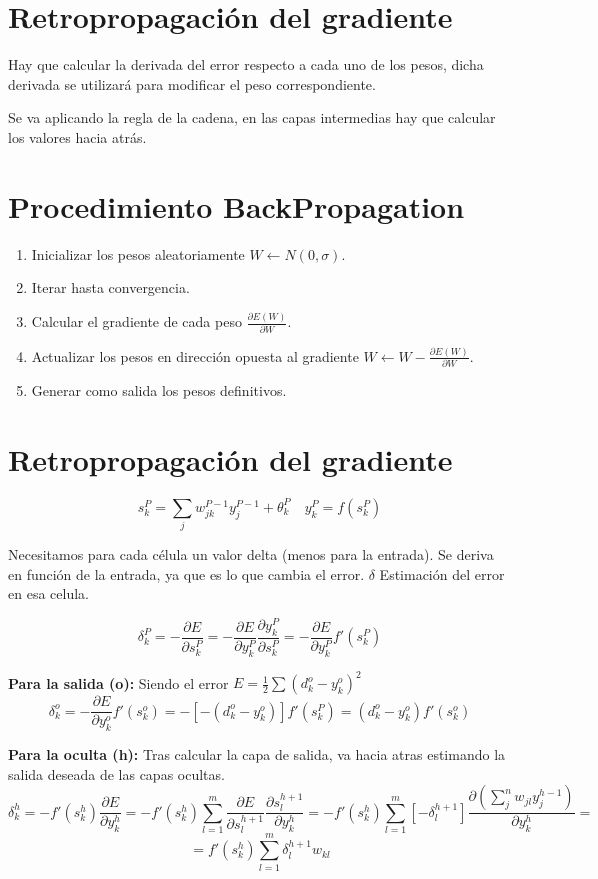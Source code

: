 \documentclass[12pt, twoside, openright]{report} %
\begin{document}
\section{Retropropagación del gradiente}
Hay que calcular la derivada del error respecto a cada uno de los pesos, dicha derivada se utilizará para modificar el peso correspondiente.

Se va aplicando la regla de la cadena, en las capas intermedias hay que calcular los valores hacia atrás.
\section{Procedimiento BackPropagation}
\begin{enumerate}
	\item Inicializar los pesos aleatoriamente $W \leftarrow N(0, \sigma)$.
	\item Iterar hasta convergencia.
	\item Calcular el gradiente de cada peso $\frac{\partial E(W)}{\partial W}$.
	\item Actualizar los pesos en dirección opuesta al gradiente $ W \leftarrow W - \frac{\partial E(W)}{\partial W}$.
	\item Generar como salida los pesos definitivos.
\end{enumerate}
\pagebreak

\section{Retropropagación del gradiente}

$$s^P_k= \sum_j w^{P-1}_{jk}y^{P-1}_j+\theta_k^P \quad y^P_k=f(s^P_k)$$

Necesitamos para cada célula un valor delta (menos para la entrada). Se deriva en función de la entrada, ya que es lo que cambia el error. $\delta$ Estimación del error en esa celula.

$$\delta^P_k=-\frac{\partial E}{\partial s^P_k}=-\frac{\partial E}{\partial y^P_k}\frac{\partial y^P_k}{\partial s^P_k}=-\frac{\partial E}{\partial y^P_k}f'(s^P_k)$$

\textbf{Para la salida (o):} Siendo el error $E=\frac 1 2 \sum (d^o_k-y^o_k)^2$
$$\delta^o_k=-\frac{\partial E}{\partial y^o_k}f'(s^o_k)=-[-(d^o_k-y^o_k)]f'(s^P_k)=(d^o_k-y^o_k)f'(s^o_k)$$

\textbf{Para la oculta (h):} Tras calcular la capa de salida, va hacia atras estimando la salida deseada de las capas ocultas.
$$\delta^h_k=-f'(s^h_k)\frac{\partial E}{\partial y^h_k}=-f'(s^h_k)\sum^{m}_{l=1}\frac{\partial E}{\partial s^{h+1}_l}\frac{\partial s^{h+1}_l}{\partial y^h_k}=-f'(s^h_k)\sum^{m}_{l=1}[-\delta^{h+1}_l]\frac{\partial (\sum_j^n w_{jl}y^{h-1}_j)}{\partial y^h_k}=$$ $$=f'(s^h_k)\sum^{m}_{l=1}\delta^{h+1}_l w_{kl}$$
\end{document}

